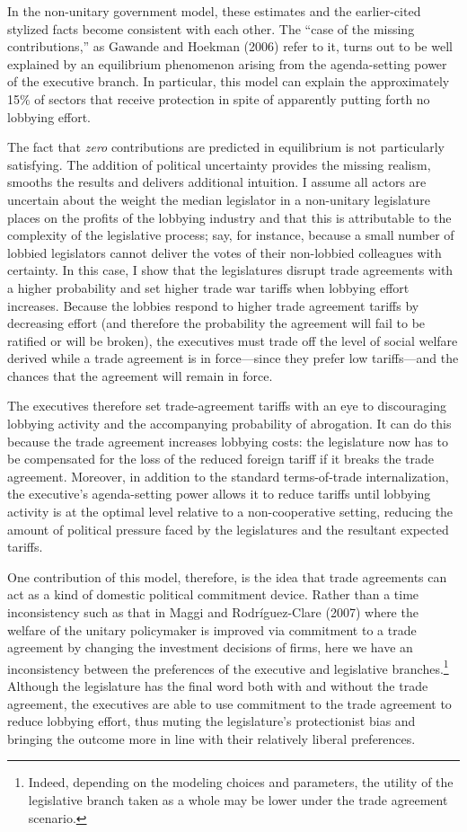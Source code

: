 \documentclass[10pt]{article}
\begin{document}
In the non-unitary government model, these estimates and the earlier-cited stylized facts become consistent with each other. The ``case of the missing contributions,'' as Gawande and Hoekman (2006) refer to it, turns out to be well explained by an equilibrium phenomenon arising from the agenda-setting power of the executive branch. In particular, this model can explain the approximately 15$\%$ of sectors that receive protection in spite of apparently putting forth no lobbying effort.

The fact that \textit{zero} contributions are predicted in equilibrium is not particularly satisfying. The addition of political uncertainty provides the missing realism, smooths the results and delivers additional intuition. I assume all actors are uncertain about the weight the median legislator in a non-unitary legislature places on the profits of the lobbying industry and that this is attributable to the complexity of the legislative process; say, for instance, because a small number of lobbied legislators cannot deliver the votes of their non-lobbied colleagues with certainty. In this case, I show that the legislatures disrupt trade agreements with a higher probability and set higher trade war tariffs when lobbying effort increases. Because the lobbies respond to higher trade agreement tariffs by decreasing effort (and therefore the probability the agreement will fail to be ratified or will be broken), the executives must trade off the level of social welfare derived while a trade agreement is in force---since they prefer low tariffs---and the chances that the agreement will remain in force.

The executives therefore set trade-agreement tariffs with an eye to discouraging lobbying activity and the accompanying probability of abrogation. It can do this because the trade agreement increases lobbying costs: the legislature now has to be compensated for the loss of the reduced foreign tariff if it breaks the trade agreement. Moreover, in addition to the standard terms-of-trade internalization, the executive's agenda-setting power allows it to reduce tariffs until lobbying activity is at the optimal level relative to a non-cooperative setting, reducing the amount of political pressure faced by the legislatures and the resultant expected tariffs.

One contribution of this model, therefore, is the idea that trade agreements can act as a kind of domestic political commitment device. Rather than a time inconsistency such as that in Maggi and Rodr\'{i}guez-Clare (2007) where the welfare of the unitary policymaker is improved via commitment to a trade agreement by changing the investment decisions of firms, here we have an inconsistency between the preferences of the executive and legislative branches.\footnote{Indeed, depending on the modeling choices and parameters, the utility of the legislative branch taken as a whole may be lower under the trade agreement scenario.} Although the legislature has the final word both with and without the trade agreement, the executives are able to use commitment to the trade agreement to reduce lobbying effort, thus muting the legislature's protectionist bias and bringing the outcome more in line with their relatively liberal preferences.
\end{document}

